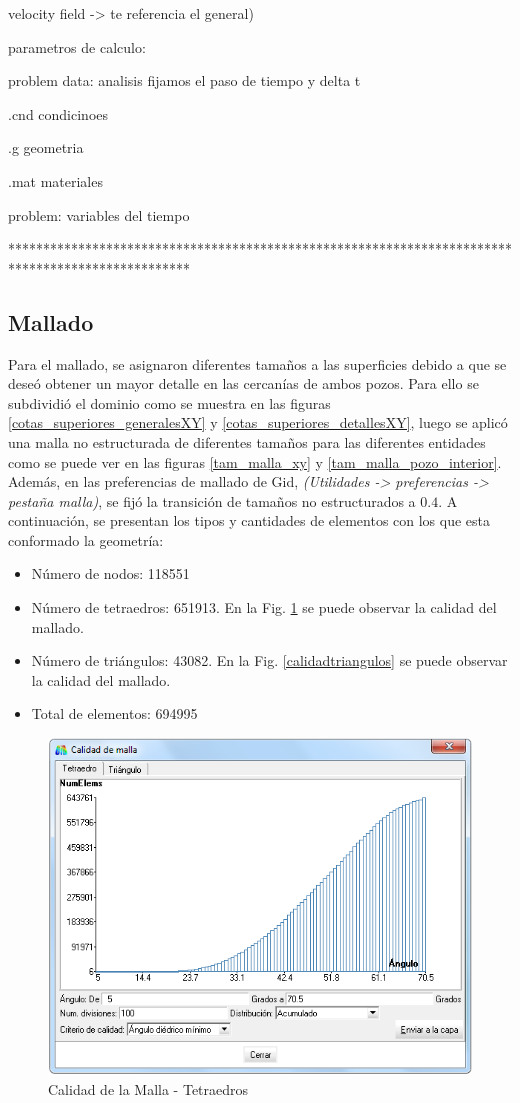 \documentclass[10pt,a4paper,final]{article}
\begin{document}
velocity field -> te referencia el general)
	
	parametros de calculo:
	
	problem data: analisis fijamos el paso de tiempo y delta t
	
	.cnd condicinoes
	
	.g geometria
	
	.mat materiales
	
	problem: variables del tiempo
	
**************************************************************************************************
%
\subsection{Mallado}
Para el mallado, se asignaron diferentes tamaños a las superficies debido a que se deseó obtener un mayor detalle en las cercanías de ambos pozos. Para ello se subdividió el dominio como se muestra en las figuras \ref{cotas_superiores_generalesXY} y \ref{cotas_superiores_detallesXY}, luego se aplicó una malla no estructurada de diferentes tamaños para las diferentes entidades como se puede ver en las figuras \ref{tam_malla_xy} y \ref{tam_malla_pozo_interior}. Además, en las preferencias de mallado de Gid, \emph{(Utilidades -> preferencias -> pestaña malla)}, se fijó la transición de tamaños no estructurados a $0.4$.
A continuación, se presentan los tipos y cantidades de elementos con los que esta conformado la geometría:
\begin{itemize}
\item Número de nodos: 118551
\item Número de tetraedros: 651913. En la Fig. \ref{calidadtetraedros} se puede observar la calidad del mallado.
\item Número de triángulos: 43082. En la Fig. \ref{calidadtriangulos} se puede observar la calidad del mallado.
\item Total de elementos: 694995
\end{itemize}

\begin{figure}[tbhp]
\centerline{\includegraphics[scale=0.60]{img/cant_tetraedros}}
\caption{Calidad de la Malla - Tetraedros}
\label{calidadtetraedros}
\end{figure}
\end{document}
